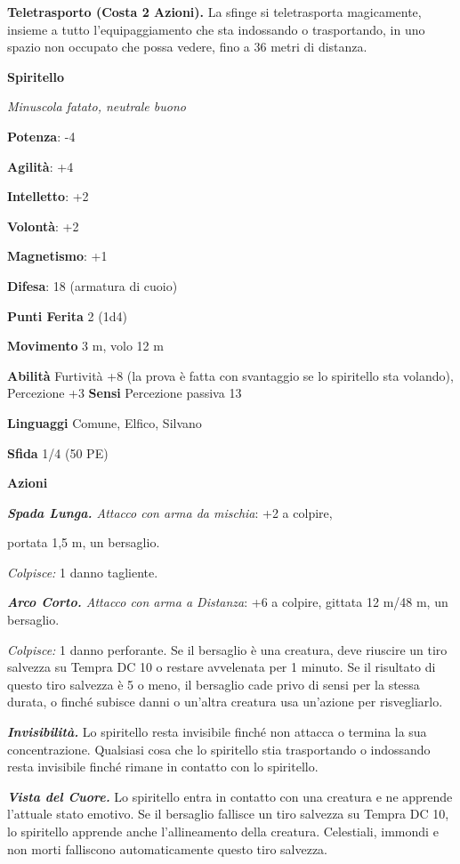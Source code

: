 \begin{multicols}{2}
\textbf{Teletrasporto (Costa 2 Azioni).} La sfinge si teletrasporta
magicamente, insieme a tutto l'equipaggiamento che sta indossando o
trasportando, in uno spazio non occupato che possa vedere, fino a 36
metri di distanza.

\textbf{Spiritello}

\emph{Minuscola fatato, neutrale buono}

\textbf{Potenza}: -4

\textbf{Agilità}: +4

\textbf{Intelletto}: +2

\textbf{Volontà}: +2

\textbf{Magnetismo}: +1

\textbf{Difesa}: 18 (armatura di cuoio)

\textbf{Punti Ferita} 2 (1d4)

\textbf{Movimento} 3 m, volo 12 m

\textbf{Abilità} Furtività +8 (la prova è fatta con svantaggio se lo
spiritello sta volando), Percezione +3 \textbf{Sensi} Percezione passiva
13

\textbf{Linguaggi} Comune, Elfico, Silvano

\textbf{Sfida} 1/4 (50 PE)

\textbf{Azioni}

\emph{\textbf{Spada Lunga.} Attacco con arma da mischia}: +2 a colpire,

portata 1,5 m, un bersaglio.

\emph{Colpisce:} 1 danno tagliente.

\emph{\textbf{Arco Corto.} Attacco con arma a Distanza}: +6 a colpire,
gittata 12 m/48 m, un bersaglio.

\emph{Colpisce:} 1 danno perforante. Se il bersaglio è una creatura,
deve riuscire un tiro salvezza su Tempra DC 10 o restare
avvelenata per 1 minuto. Se il risultato di questo tiro salvezza è 5 o
meno, il bersaglio cade privo di sensi per la stessa durata, o finché
subisce danni o un'altra creatura usa un'azione per risvegliarlo.

\emph{\textbf{Invisibilità.}} Lo spiritello resta invisibile finché non
attacca o termina la sua concentrazione. Qualsiasi cosa che lo
spiritello stia trasportando o indossando resta invisibile finché rimane
in contatto con lo spiritello.

\emph{\textbf{Vista del Cuore.}} Lo spiritello entra in contatto con una
creatura e ne apprende l'attuale stato emotivo. Se il bersaglio fallisce
un tiro salvezza su Tempra DC 10, lo spiritello apprende anche
l'allineamento della creatura. Celestiali, immondi e non morti
falliscono automaticamente questo tiro salvezza.




\end{multicols}
